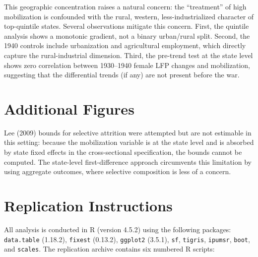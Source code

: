 \documentclass[12pt]{article}
\begin{document}
This geographic concentration raises a natural concern: the ``treatment'' of high mobilization is confounded with the rural, western, less-industrialized character of top-quintile states. Several observations mitigate this concern. First, the quintile analysis shows a monotonic gradient, not a binary urban/rural split. Second, the 1940 controls include urbanization and agricultural employment, which directly capture the rural-industrial dimension. Third, the pre-trend test at the state level shows zero correlation between 1930--1940 female LFP changes and mobilization, suggesting that the differential trends (if any) are not present before the war.


\section{Additional Figures}
\label{app:figures}

Lee (2009) bounds for selective attrition were attempted but are not estimable in this setting: because the mobilization variable is at the state level and is absorbed by state fixed effects in the cross-sectional specification, the bounds cannot be computed. The state-level first-difference approach circumvents this limitation by using aggregate outcomes, where selective composition is less of a concern.


\section{Replication Instructions}
\label{app:replication}

All analysis is conducted in R (version 4.5.2) using the following packages: \texttt{data.table} (1.18.2), \texttt{fixest} (0.13.2), \texttt{ggplot2} (3.5.1), \texttt{sf}, \texttt{tigris}, \texttt{ipumsr}, \texttt{boot}, and \texttt{scales}. The replication archive contains six numbered R scripts:
\end{document}
